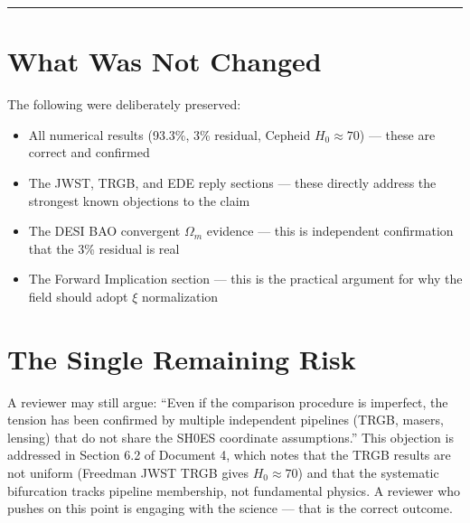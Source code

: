 \documentclass[12pt,a4paper]{article}
\begin{document}
\bigskip
\hrule
\bigskip

\section*{What Was Not Changed}

The following were deliberately preserved:
\begin{itemize}[noitemsep]
    \item All numerical results (93.3\%, 3\% residual, Cepheid
    $H_0 \approx 70$) --- these are correct and confirmed
    \item The JWST, TRGB, and EDE reply sections --- these directly
    address the strongest known objections to the claim
    \item The DESI BAO convergent $\Omega_m$ evidence --- this is
    independent confirmation that the 3\% residual is real
    \item The Forward Implication section --- this is the practical
    argument for why the field should adopt $\xi$ normalization
\end{itemize}

\section*{The Single Remaining Risk}

A reviewer may still argue: ``Even if the comparison procedure is
imperfect, the tension has been confirmed by multiple independent
pipelines (TRGB, masers, lensing) that do not share the SH0ES
coordinate assumptions.'' This objection is addressed in Section 6.2
of Document 4, which notes that the TRGB results are not uniform
(Freedman JWST TRGB gives $H_0 \approx 70$) and that the systematic
bifurcation tracks pipeline membership, not fundamental physics.
A reviewer who pushes on this point is engaging with the science ---
that is the correct outcome.
\end{document}
